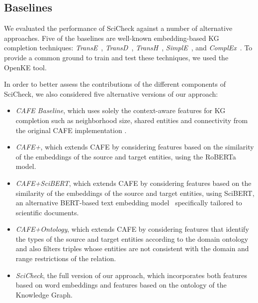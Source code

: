 \subsection{Baselines}
We evaluated the performance of SciCheck against a number of alternative approaches. Five of the baselines are well-known embedding-based KG completion techniques: \textit{TransE}~\cite{bordes2013}, \textit{TransD}~\cite{ji2015}, \textit{TransH}~\cite{wang2014}, \textit{SimplE}~\cite{kazemi2018}, and \textit{ComplEx}~\cite{trouillon2016}. To provide a common ground to train and test these techniques, we used the OpenKE \cite{han2018} tool.

In order to better assess the contributions of the different components of SciCheck, we also considered five alternative versions of our approach:

\begin{itemize}
    \item \textit{CAFE Baseline}, which uses solely the context-aware features for KG completion such as neighborhood size, shared entities and connectivity from the original CAFE implementation \cite{borrego2021}.\\
    
    \item \textit{CAFE+\roberta}, which extends CAFE by considering features based on the similarity of the embeddings of the source and target entities, using the RoBERTa model.\\
    
    \item \textit{CAFE+SciBERT}, which extends CAFE by considering features based on the similarity of the embeddings of the source and target entities, using SciBERT, an alternative BERT-based text embedding model~\cite{reimers2019} specifically tailored to scientific documents.\\
    
    \item \textit{CAFE+Ontology}, which extends CAFE by considering features that identify the types of the source and target entities according to the domain ontology and also filters triples whose entities are not consistent with the domain and range restrictions of the relation.\\
    
    \item \textit{SciCheck}, the full version of our approach, which incorporates both features based on word embeddings and features based on the ontology of the Knowledge Graph.
\end{itemize}


